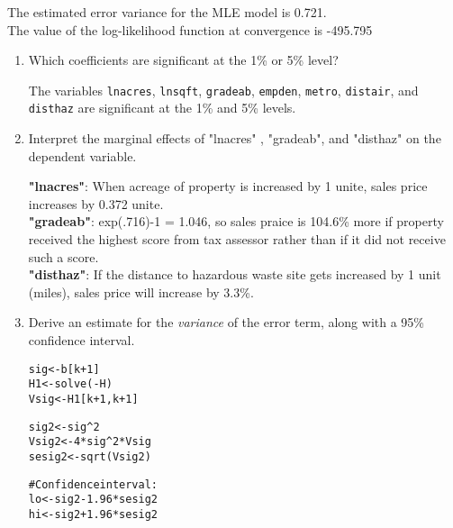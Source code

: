 \documentclass[11pt,reqno]{amsart}\usepackage[]{graphicx}\usepackage[]{color}
\makeatletter
\newcommand{\hlnum}[1]{\textcolor[rgb]{0.063,0.58,0.627}{#1}}%
\newcommand{\hlcom}[1]{\textcolor[rgb]{0.588,0.588,0.588}{#1}}%
\newcommand{\hlopt}[1]{\textcolor[rgb]{0.196,0.196,0.196}{#1}}%
\newcommand{\hlstd}[1]{\textcolor[rgb]{0.196,0.196,0.196}{#1}}%
\newcommand{\hlkwb}[1]{\textcolor[rgb]{0.627,0,0.314}{#1}}%
\newcommand{\hlkwd}[1]{\textcolor[rgb]{0.78,0.227,0.412}{#1}}%
\newenvironment{kframe}{%
 \def\at@end@of@kframe{}%
 \ifinner\ifhmode%
  \def\at@end@of@kframe{\end{minipage}}%
  \begin{minipage}{\columnwidth}%
 \fi\fi%
 \def\FrameCommand##1{\hskip\@totalleftmargin \hskip-\fboxsep
 \colorbox{shadecolor}{##1}\hskip-\fboxsep
     \hskip-\linewidth \hskip-\@totalleftmargin \hskip\columnwidth}%
 \MakeFramed {\advance\hsize-\width
   \@totalleftmargin\z@ \linewidth\hsize
   \@setminipage}}%
 {\par\unskip\endMakeFramed%
 \at@end@of@kframe}
\newenvironment{knitrout}{}{} %
\makeatother
\begin{document}
The estimated error variance for the MLE model is 0.721. \\
The value of the log-likelihood function at convergence is -495.795\\


\begin{enumerate}[(1)]
\item Which coefficients are significant at the 1\% or 5\% level?

The variables \texttt{lnacres}, \texttt{lnsqft}, \texttt{gradeab}, \texttt{empden}, \texttt{metro}, \texttt{distair}, and \texttt{disthaz} are significant at the 1\% and 5\% levels.\\

\item Interpret the marginal effects of "lnacres" , "gradeab", and "disthaz" on the dependent variable.

{\bf"lnacres"}: When acreage of property is increased by 1 unite, sales price increases by 0.372 unite.\\

{\bf"gradeab"}: exp(.716)-1 = 1.046, so sales praice is 104.6\% more if property received the highest score from tax assessor rather than if it did not receive such a score.\\

{\bf"disthaz"}: If the distance to hazardous waste site gets increased by 1 unit (miles), sales price will increase by 3.3\%.\\

\item Derive an estimate for the \emph{variance} of the error term, along with a 95\% confidence interval.

\begin{knitrout}
\color{fgcolor}\begin{kframe}
\begin{alltt}
\hlstd{sig} \hlkwb{<-} \hlstd{b[k} \hlopt{+} \hlnum{1}\hlstd{]}
\hlstd{H1} \hlkwb{<-} \hlkwd{solve}\hlstd{(}\hlopt{-}\hlstd{H)}
\hlstd{Vsig} \hlkwb{<-} \hlstd{H1[k} \hlopt{+} \hlnum{1}\hlstd{, k} \hlopt{+} \hlnum{1}\hlstd{]}

\hlstd{sig2} \hlkwb{<-} \hlstd{sig}\hlopt{^}\hlnum{2}
\hlstd{Vsig2} \hlkwb{<-} \hlnum{4} \hlopt{*} \hlstd{sig}\hlopt{^}\hlnum{2} \hlopt{*} \hlstd{Vsig}
\hlstd{sesig2} \hlkwb{<-} \hlkwd{sqrt}\hlstd{(Vsig2)}

\hlcom{# Confidence interval:}
\hlstd{lo} \hlkwb{<-} \hlstd{sig2} \hlopt{-} \hlnum{1.96} \hlopt{*} \hlstd{sesig2}
\hlstd{hi} \hlkwb{<-} \hlstd{sig2} \hlopt{+} \hlnum{1.96} \hlopt{*} \hlstd{sesig2}


\end{alltt}
\end{kframe}
\end{knitrout}
\end{enumerate}
\end{document}
